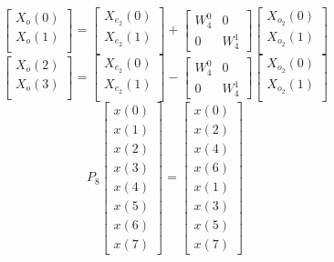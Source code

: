 \documentclass[journal,12pt,twocolumn]{IEEEtran}
\renewcommand\thesection{\arabic{section}}
\begin{document}
\begin{enumerate}[label=\thesection.\arabic*.,ref=\thesection.\theenumi]
\begin{equation}
\begin{bmatrix}
X_{o}(0) \\ 
X_{o}(1)\\ 
\end{bmatrix}
=
\begin{bmatrix}
X_{e_{2}}(0) \\ 
X_{e_{2}}(1)\\ 
\end{bmatrix}
+
\begin{bmatrix}
W^{0}_{4} & 0\\
0 & W^{1}_{4}
\end{bmatrix}
\begin{bmatrix}
X_{o_{2}}(0) \\ 
X_{o_{2}}(1) \\ 
\end{bmatrix}
\end{equation}
\begin{equation}
\begin{bmatrix}
X_{o}(2) \\ 
X_{o}(3)\\ 
\end{bmatrix}
=
\begin{bmatrix}
X_{e_{2}}(0) \\ 
X_{e_{2}}(1)\\ 
\end{bmatrix}
-
\begin{bmatrix}
W^{0}_{4} & 0\\
0 & W^{1}_{4}
\end{bmatrix}
\begin{bmatrix}
X_{o_{2}}(0) \\ 
X_{o_{2}}(1) \\ 
\end{bmatrix}
\end{equation}
\begin{equation}
P_{8}
\begin{bmatrix}
x(0) \\ 
x(1) \\ 
x(2) \\ 
x(3) \\ 
x(4) \\ 
x(5) \\
x(6) \\
x(7)
\end{bmatrix}
 = 
\begin{bmatrix}
x(0) \\ 
x(2) \\ 
x(4) \\ 
x(6) \\
x(1) \\ 
x(3) \\ 
x(5) \\
x(7)
\end{bmatrix}
\end{equation}


\end{enumerate}
\end{document}
